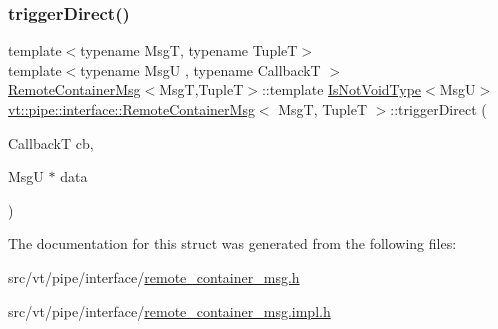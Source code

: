 \mbox{\label{structvt_1_1pipe_1_1interface_1_1_remote_container_msg_ae4913666223bebdeda5d7da19beec782}} 
\subsubsection{\texorpdfstring{trigger\+Direct()}{triggerDirect()}\hspace{0.1cm}{\footnotesize\ttfamily [2/2]}}
{\footnotesize\ttfamily template$<$typename MsgT, typename TupleT$>$ \\
template$<$typename MsgU , typename CallbackT $>$ \\
\hyperlink{structvt_1_1pipe_1_1interface_1_1_remote_container_msg}{Remote\+Container\+Msg}$<$MsgT,TupleT$>$\+::template \hyperlink{structvt_1_1pipe_1_1interface_1_1_remote_container_msg_ab12f66d491cc0783269a302390f76a1d}{Is\+Not\+Void\+Type}$<$MsgU$>$ \hyperlink{structvt_1_1pipe_1_1interface_1_1_remote_container_msg}{vt\+::pipe\+::interface\+::\+Remote\+Container\+Msg}$<$ MsgT, TupleT $>$\+::trigger\+Direct (\begin{DoxyParamCaption}\item[{CallbackT}]{cb,  }\item[{MsgU $\ast$}]{data }\end{DoxyParamCaption})}



The documentation for this struct was generated from the following files\+:\begin{DoxyCompactItemize}
\item 
src/vt/pipe/interface/\hyperlink{remote__container__msg_8h}{remote\+\_\+container\+\_\+msg.\+h}\item 
src/vt/pipe/interface/\hyperlink{remote__container__msg_8impl_8h}{remote\+\_\+container\+\_\+msg.\+impl.\+h}\end{DoxyCompactItemize}
